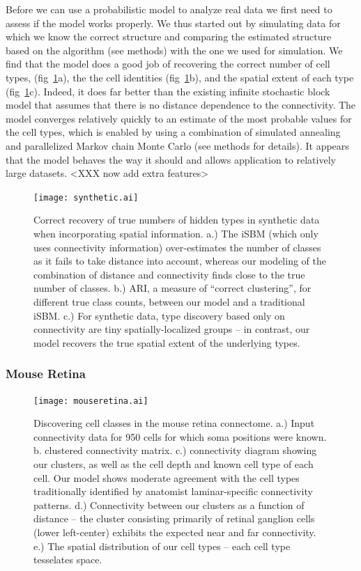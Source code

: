 \documentclass{nature}
\begin{document}
Before we can use a probabilistic model to analyze real data we first
need to assess if the model works properly. We thus started out by
simulating data for which we know the correct structure and comparing
the estimated structure based on the algorithm (see methods) with the
one we used for simulation. We find that the model does a good job of
recovering the correct number of cell types,
(fig~\ref{fig:synthetic}a), the the cell identities
(fig~\ref{fig:synthetic}b), and the spatial extent of each type
(fig~\ref{fig:synthetic}c).  Indeed, it does far better than the
existing infinite stochastic block model that assumes that there is no
distance dependence to the connectivity. The model converges
relatively quickly to an estimate of the most probable values for the
cell types, which is enabled by using a combination of simulated
annealing and parallelized Markov chain Monte Carlo (see methods for
details). It appears that the model behaves the way it should and
allows application to relatively large datasets.
<XXX now add extra features>

\begin{figure}
  \centering 
  \centerline{\texttt{[image: synthetic.ai]}}
  \caption{Correct recovery of true numbers of hidden types in
    synthetic data when incorporating spatial information. a.) The
    iSBM (which only uses connectivity information) over-estimates the
    number of classes as it fails to take distance into account,
    whereas our modeling of the combination of distance and
    connectivity finds close to the true number of classes. b.) ARI, a
    measure of ``correct clustering'', for different true class
    counts, between our model and a traditional iSBM. c.) For
    synthetic data, type discovery based only on connectivity are
    tiny spatially-localized groups -- in
    contrast, our model recovers the true spatial extent of the
    underlying types.  }
\label{fig:synthetic}
\end{figure}

\subsubsection{Mouse Retina}

\begin{figure}
  \centering 
  \centerline{\texttt{[image: mouseretina.ai]}}
  \caption{Discovering cell classes in the mouse retina connectome.
    a.) Input connectivity data for 950 cells for which soma positions
    were known. b. clustered connectivity matrix. c.) connectivity
    diagram showing our clusters, as well as the cell depth and known
    cell type of each cell. Our model shows moderate agreement with
    the cell types traditionally identified by anatomist
    laminar-specific connectivity patterns. 
    d.) Connectivity between our clusters as a function of distance --
    the cluster consisting primarily of retinal ganglion cells (lower
    left-center) exhibits the expected near and far connectivity. e.)
    The spatial distribution of our cell types -- each cell type
    tesselates space.}
\label{fig:mouseretina}
\end{figure}
\end{document}
